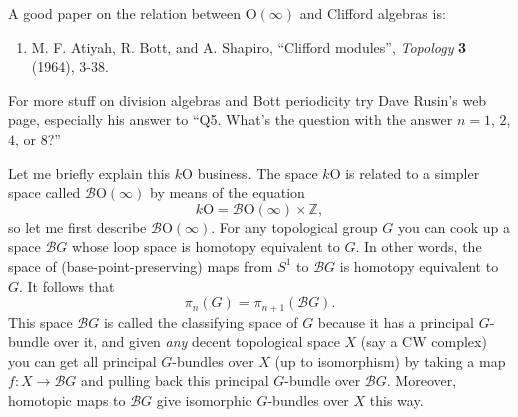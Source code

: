 \documentclass{article}
\def\tightlist{}
\renewcommand{\texttt}[1]{%
  \begingroup
  \ttfamily
  \begingroup\lccode`~=`/\lowercase{\endgroup\def~}{/\discretionary{}{}{}}%
  \begingroup\lccode`~=`[\lowercase{\endgroup\def~}{[\discretionary{}{}{}}%
  \begingroup\lccode`~=`.\lowercase{\endgroup\def~}{.\discretionary{}{}{}}%
  \catcode`/=\active\catcode`[=\active\catcode`.=\active
  \scantokens{#1\noexpand}%
  \endgroup
}
\begin{document}
A good paper on the relation between \(\mathrm{O}(\infty)\) and Clifford
algebras is:

\begin{enumerate}
\def\labelenumi{\arabic{enumi})}
\setcounter{enumi}{1}
\tightlist
\item
  M. F. Atiyah, R. Bott, and A. Shapiro, ``Clifford modules'',
  \emph{Topology} \textbf{3} (1964), 3-38.
\end{enumerate}

For more stuff on division algebras and Bott periodicity try Dave
Rusin's web page, especially his answer to ``Q5. What's the question
with the answer \(n = 1\), \(2\), \(4\), or \(8\)?''


Let me briefly explain this \(k\mathrm{O}\) business. The space
\(k\mathrm{O}\) is related to a simpler space called
\(\mathcal{B}\mathrm{O}(\infty)\) by means of the equation
\[k\mathrm{O} = \mathcal{B}\mathrm{O}(\infty)\times\mathbb{Z},\] so let
me first describe \(\mathcal{B}\mathrm{O}(\infty)\). For any topological
group \(G\) you can cook up a space \(\mathcal{B}G\) whose loop space is
homotopy equivalent to \(G\). In other words, the space of
(base-point-preserving) maps from \(S^1\) to \(\mathcal{B}G\) is
homotopy equivalent to \(G\). It follows that
\[\pi_n(G) = \pi_{n+1}(\mathcal{B}G).\] This space \(\mathcal{B}G\) is
called the classifying space of \(G\) because it has a principal
\(G\)-bundle over it, and given \emph{any} decent topological space
\(X\) (say a CW complex) you can get all principal \(G\)-bundles over
\(X\) (up to isomorphism) by taking a map \(f\colon X\to\mathcal{B}G\)
and pulling back this principal \(G\)-bundle over \(\mathcal{B}G\).
Moreover, homotopic maps to \(\mathcal{B}G\) give isomorphic
\(G\)-bundles over \(X\) this way.
\end{document}
